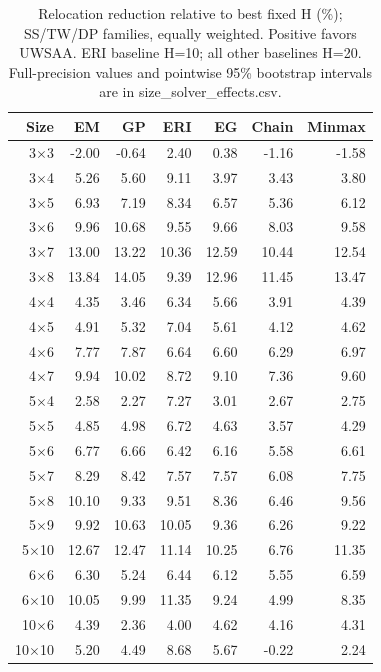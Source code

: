 \begin{table}[t]
\centering\scriptsize
\caption{Relocation reduction relative to best fixed H (\%); SS/TW/DP families, equally weighted. Positive favors UWSAA. ERI baseline H=10; all other baselines H=20. Full-precision values and pointwise 95\% bootstrap intervals are in size_solver_effects.csv.}
\setlength{\tabcolsep}{4pt}
\begin{tabular}{rrrrrrr}
\toprule
Size & EM & GP & ERI & EG & Chain & Minmax \\
\midrule
3$\times$3 & -2.00 & -0.64 & 2.40 & 0.38 & -1.16 & -1.58 \\
3$\times$4 & 5.26 & 5.60 & 9.11 & 3.97 & 3.43 & 3.80 \\
3$\times$5 & 6.93 & 7.19 & 8.34 & 6.57 & 5.36 & 6.12 \\
3$\times$6 & 9.96 & 10.68 & 9.55 & 9.66 & 8.03 & 9.58 \\
3$\times$7 & 13.00 & 13.22 & 10.36 & 12.59 & 10.44 & 12.54 \\
3$\times$8 & 13.84 & 14.05 & 9.39 & 12.96 & 11.45 & 13.47 \\
4$\times$4 & 4.35 & 3.46 & 6.34 & 5.66 & 3.91 & 4.39 \\
4$\times$5 & 4.91 & 5.32 & 7.04 & 5.61 & 4.12 & 4.62 \\
4$\times$6 & 7.77 & 7.87 & 6.64 & 6.60 & 6.29 & 6.97 \\
4$\times$7 & 9.94 & 10.02 & 8.72 & 9.10 & 7.36 & 9.60 \\
5$\times$4 & 2.58 & 2.27 & 7.27 & 3.01 & 2.67 & 2.75 \\
5$\times$5 & 4.85 & 4.98 & 6.72 & 4.63 & 3.57 & 4.29 \\
5$\times$6 & 6.77 & 6.66 & 6.42 & 6.16 & 5.58 & 6.61 \\
5$\times$7 & 8.29 & 8.42 & 7.57 & 7.57 & 6.08 & 7.75 \\
5$\times$8 & 10.10 & 9.33 & 9.51 & 8.36 & 6.46 & 9.56 \\
5$\times$9 & 9.92 & 10.63 & 10.05 & 9.36 & 6.26 & 9.22 \\
5$\times$10 & 12.67 & 12.47 & 11.14 & 10.25 & 6.76 & 11.35 \\
6$\times$6 & 6.30 & 5.24 & 6.44 & 6.12 & 5.55 & 6.59 \\
6$\times$10 & 10.05 & 9.99 & 11.35 & 9.24 & 4.99 & 8.35 \\
10$\times$6 & 4.39 & 2.36 & 4.00 & 4.62 & 4.16 & 4.31 \\
10$\times$10 & 5.20 & 4.49 & 8.68 & 5.67 & -0.22 & 2.24 \\
\bottomrule
\end{tabular}
\end{table}